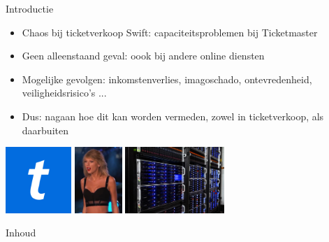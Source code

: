 \documentclass{beamer}
\begin{document}
\begin{frame}{Introductie}
    \begin{itemize}
        \item Chaos bij ticketverkoop Swift: capaciteitsproblemen bij Ticketmaster
        \item Geen alleenstaand geval: oook bij andere online diensten
        \item Mogelijke gevolgen: inkomstenverlies, imagoschado, ontevredenheid,
        veiligheidsrisico's ...
        \item Dus: nagaan hoe dit kan worden vermeden, zowel in
        ticketverkoop, als daarbuiten
    \end{itemize}
    \begin{center}
        \includegraphics[height = 2.5cm]{ticketmaster-logo.png}
        \includegraphics[height = 2.5cm]{taylor-swift.png}
        \includegraphics[height = 2.5cm]{server-rack.jpg}
    \end{center}
\end{frame}


\begin{frame}{Inhoud}
  \tableofcontents
\end{frame}
\end{document}

